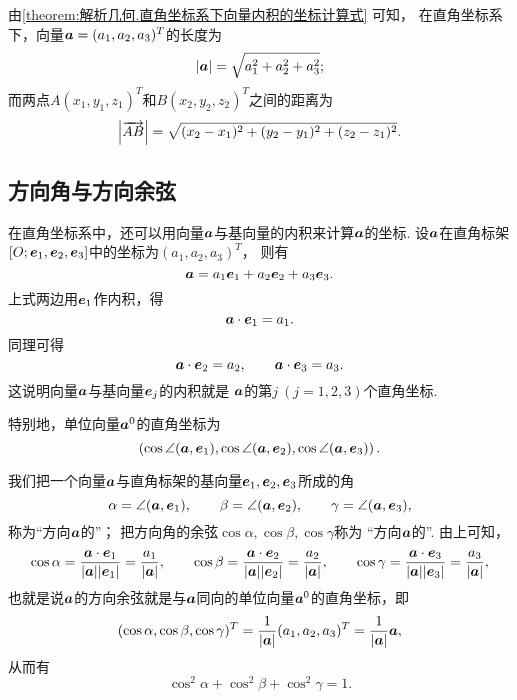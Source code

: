 由\cref{theorem:解析几何.直角坐标系下向量内积的坐标计算式} 可知，
在直角坐标系下，向量\(\boldsymbol{a}=(a_1,a_2,a_3)^T\)的长度为\begin{equation}
	\abs{\boldsymbol{a}} = \sqrt{a_1^2+a_2^2+a_3^2};
\end{equation}
而两点\(A(x_1,y_1,z_1)^T\)和\(B(x_2,y_2,z_2)^T\)之间的距离为\begin{equation}
	\abs{\overrightarrow{AB}} = \sqrt{(x_2-x_1)^2+(y_2-y_1)^2+(z_2-z_1)^2}.
\end{equation}

\subsection{方向角与方向余弦}
在直角坐标系中，还可以用向量\(\boldsymbol{a}\)与基向量的内积来计算\(\boldsymbol{a}\)的坐标.
设\(\boldsymbol{a}\)在直角标架\([O;\boldsymbol{e}_1,\boldsymbol{e}_2,\boldsymbol{e}_3]\)中的坐标为\((a_1,a_2,a_3)^T\)，
则有\begin{equation*}
	\boldsymbol{a}=a_1 \boldsymbol{e}_1 + a_2 \boldsymbol{e}_2 + a_3 \boldsymbol{e}_3.
\end{equation*}
上式两边用\(\boldsymbol{e}_1\)作内积，得\begin{equation*}
	\boldsymbol{a}\cdot\boldsymbol{e}_1 = a_1.
\end{equation*}
同理可得\begin{equation*}
	\boldsymbol{a}\cdot\boldsymbol{e}_2 = a_2, \qquad
	\boldsymbol{a}\cdot\boldsymbol{e}_3 = a_3.
\end{equation*}
这说明向量\(\boldsymbol{a}\)与基向量\(\boldsymbol{e}_j\)的内积就是
\(\boldsymbol{a}\)的第\(j\ (j=1,2,3)\)个直角坐标.

特别地，单位向量\(\boldsymbol{a}^0\)的直角坐标为\begin{equation*}
	\left( \cos\angle(\boldsymbol{a},\boldsymbol{e}_1),
	\cos\angle(\boldsymbol{a},\boldsymbol{e}_2),
	\cos\angle(\boldsymbol{a},\boldsymbol{e}_3) \right).
\end{equation*}

我们把一个向量\(\boldsymbol{a}\)与直角标架的基向量\(\boldsymbol{e}_1,\boldsymbol{e}_2,\boldsymbol{e}_3\)所成的角\begin{equation*}
	\alpha=\angle(\boldsymbol{a},\boldsymbol{e}_1), \qquad
	\beta=\angle(\boldsymbol{a},\boldsymbol{e}_2), \qquad
	\gamma=\angle(\boldsymbol{a},\boldsymbol{e}_3),
\end{equation*}称为“方向\(\boldsymbol{a}\)的”；
把方向角的余弦\(\cos\alpha,\cos\beta,\cos\gamma\)称为
“方向\(\boldsymbol{a}\)的”.
由上可知，\begin{equation*}
	\cos\alpha
	= \frac{\boldsymbol{a}\cdot\boldsymbol{e}_1}{\abs{\boldsymbol{a}}\abs{\boldsymbol{e}_1}}
	= \frac{a_1}{\abs{\boldsymbol{a}}},
	\qquad
	\cos\beta
	= \frac{\boldsymbol{a}\cdot\boldsymbol{e}_2}{\abs{\boldsymbol{a}}\abs{\boldsymbol{e}_2}}
	= \frac{a_2}{\abs{\boldsymbol{a}}},
	\qquad
	\cos\gamma
	= \frac{\boldsymbol{a}\cdot\boldsymbol{e}_3}{\abs{\boldsymbol{a}}\abs{\boldsymbol{e}_3}}
	= \frac{a_3}{\abs{\boldsymbol{a}}},
\end{equation*}
也就是说\(\boldsymbol{a}\)的方向余弦就是与\(\boldsymbol{a}\)同向的单位向量\(\boldsymbol{a}^0\)的直角坐标，即\begin{equation*}
	(\cos\alpha,\cos\beta,\cos\gamma)^T
	= \frac{1}{\abs{\boldsymbol{a}}} (a_1,a_2,a_3)^T
	= \frac{1}{\abs{\boldsymbol{a}}} \boldsymbol{a},
\end{equation*}
从而有\begin{equation*}
	\cos^2\alpha+\cos^2\beta+\cos^2\gamma=1.
\end{equation*}
